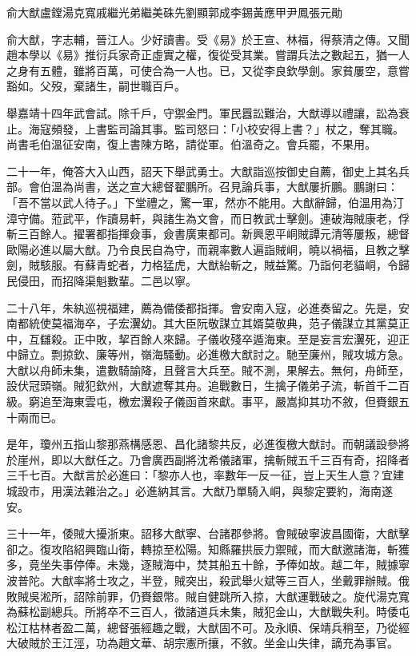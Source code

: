
\begin{pinyinscope}
俞大猷盧鏜湯克寬戚繼光弟繼美硃先劉顯郭成李錫黃應甲尹鳳張元勛

俞大猷，字志輔，晉江人。少好讀書。受《易》於王宣、林福，得蔡清之傳。又聞趙本學以《易》推衍兵家奇正虛實之權，復從受其業。嘗謂兵法之數起五，猶一人之身有五體，雖將百萬，可使合為一人也。已，又從李良欽學劍。家貧屢空，意嘗豁如。父歿，棄諸生，嗣世職百戶。

舉嘉靖十四年武會試。除千戶，守禦金門。軍民囂訟難治，大猷導以禮讓，訟為衰止。海寇頻發，上書監司論其事。監司怒曰：「小校安得上書？」杖之，奪其職。尚書毛伯溫征安南，復上書陳方略，請從軍。伯溫奇之。會兵罷，不果用。

二十一年，俺答大入山西，詔天下舉武勇士。大猷詣巡按御史自薦，御史上其名兵部。會伯溫為尚書，送之宣大總督翟鵬所。召見論兵事，大猷屢折鵬。鵬謝曰：「吾不當以武人待子。」下堂禮之，驚一軍，然亦不能用。大猷辭歸，伯溫用為汀漳守備。蒞武平，作讀易軒，與諸生為文會，而日教武士擊劍。連破海賊康老，俘斬三百餘人。擢署都指揮僉事，僉書廣東都司。新興恩平峒賊譚元清等屢叛，總督歐陽必進以屬大猷。乃令良民自為守，而親率數人遍詣賊峒，曉以禍福，且教之擊劍，賊駭服。有蘇青蛇者，力格猛虎，大猷紿斬之，賊益驚。乃詣何老貓峒，令歸民侵田，而招降渠魁數輩。二邑以寧。

二十八年，朱紈巡視福建，薦為備倭都指揮。會安南入寇，必進奏留之。先是，安南都統使莫福海卒，子宏瀷幼。其大臣阮敬謀立其婿莫敬典，范子儀謀立其黨莫正中，互讎殺。正中敗，挈百餘人來歸。子儀收殘卒遁海東。至是妄言宏瀷死，迎正中歸立。剽掠欽、廉等州，嶺海騷動。必進檄大猷討之。馳至廉州，賊攻城方急。大猷以舟師未集，遣數騎諭降，且聲言大兵至。賊不測，果解去。無何，舟師至，設伏冠頭嶺。賊犯欽州，大猷遮奪其舟。追戰數日，生擒子儀弟子流，斬首千二百級。窮追至海東雲屯，檄宏瀷殺子儀函首來獻。事平，嚴嵩抑其功不敘，但賚銀五十兩而已。

是年，瓊州五指山黎那燕構感恩、昌化諸黎共反，必進復檄大猷討。而朝議設參將於崖州，即以大猷任之。乃會廣西副將沈希儀諸軍，擒斬賊五千三百有奇，招降者三千七百。大猷言於必進曰：「黎亦人也，率數年一反一征，豈上天生人意？宜建城設市，用漢法雜治之。」必進納其言。大猷乃單騎入峒，與黎定要約，海南遂安。

三十一年，倭賊大擾浙東。詔移大猷寧、台諸郡參將。會賊破寧波昌國衛，大猷擊卻之。復攻陷紹興臨山衛，轉掠至松陽。知縣羅拱辰力禦賊，而大猷邀諸海，斬獲多，竟坐失事停俸。未幾，逐賊海中，焚其船五十餘，予俸如故。越二年，賊據寧波普陀。大猷率將士攻之，半登，賊突出，殺武舉火斌等三百人，坐戴罪辦賊。俄敗賊吳淞所，詔除前罪，仍賚銀幣。賊自健跳所入掠，大猷運戰破之。旋代湯克寬為蘇松副總兵。所將卒不三百人，徵諸道兵未集，賊犯金山，大猷戰失利。時倭屯松江枯林者盈二萬，總督張經趣之戰，大猷固不可。及永順、保靖兵稍至，乃從經大破賊於王江涇，功為趙文華、胡宗憲所攘，不敘。坐金山失律，謫充為事官。


\end{pinyinscope}
